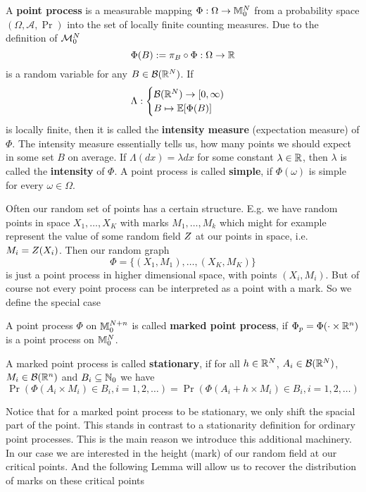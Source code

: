 \begin{definition}
	A \textbf{point process} is a measurable mapping \(\Phi:\Omega\to\locFiniteMeasure\)
	from a probability space \((\Omega, \mathcal{A}, \Pr)\) into the set of
	locally finite counting measures. Due to the definition of \(\locFiniteMeasAlg\)
	\[
		\Phi(B) := \pi_B\circ \Phi : \Omega \to \real
	\]
	is a random variable for any \(B\in\borel(\real^\dimension)\). If
	\[
		\Lambda:\begin{cases}
			\borel(\real^\dimension)\to [0,\infty)\\
			B \mapsto \E[\Phi(B)]
		\end{cases}
	\]
	is locally finite, then it is called the \textbf{intensity measure}
	(expectation measure) of \(\Phi\). The intensity measure essentially tells
	us, how many points we should expect in some set \(B\) on average.
	If \(\Lambda(dx) = \lambda dx\) for some
	constant \(\lambda\in\real\), then \(\lambda\) is called the
	\textbf{intensity} of \(\Phi\).
	A point process is called \textbf{simple}, if \(\Phi(\omega)\) is simple
	for every \(\omega\in\Omega\).
\end{definition}

Often our random set of points has a certain structure. E.g. we have
random points in space \(X_1,\dots, X_K\) with marks \(M_1,\dots, M_k\) which
might for example represent the value of some random field \(\rf\) at our
points in space, i.e. \(M_i=\rf(X_i)\). Then our random graph 
\[
	\Phi = \{ (X_1, M_1), \dots, (X_K, M_K) \}
\]
is just a point process in higher dimensional space, with points \((X_i, M_i)\).
But of course not every point process can be interpreted as a point with a mark.
So we define the special case

\begin{definition}
	A point process \(\Phi\) on \(\locFiniteMeasure[\dimension+n]\) is called
	\textbf{marked point process}, if \(\Phi_p = \Phi(\cdot \times \real^n)\)
	is a point process on \(\locFiniteMeasure\).

	A marked point process is called \textbf{stationary}, if for all
	\(h\in\real^\dimension\), \(A_i\in\borel(\real^\dimension)\),
	\(M_i\in\borel(\real^n)\) and \(B_i\subseteq\nat_0\) we have
	\[
		\Pr(\Phi(A_i\times M_i) \in B_i, i=1,2,\dots)
		= \Pr(\Phi(A_i+h \times M_i)\in B_i, i=1,2,\dots)
	\]
\end{definition}

Notice that for a marked point process to be stationary, we only shift the
spacial part of the point. This stands in contrast to a stationarity definition
for ordinary point processes. This is the main reason we introduce this
additional machinery. In our case we are interested in the height (mark) of
our random field at our critical points. And the following Lemma will allow us
to recover the distribution of marks on these critical points

